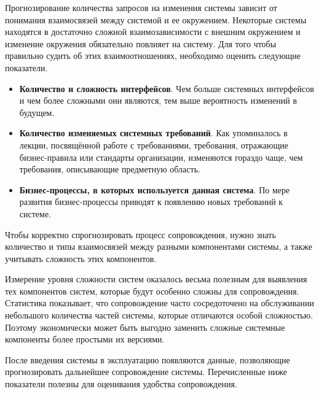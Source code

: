 \documentclass{../../text-style}
\begin{document}
Прогнозирование количества запросов на изменения системы зависит от понимания взаимосвязей между системой и ее окружением. Некоторые системы находятся в достаточно сложной взаимозависимости с внешним окружением и изменение окружения обязательно повлияет на систему. Для того чтобы правильно судить об этих взаимоотношениях, необходимо оценить следующие показатели.

\begin{itemize}
    \item \textbf{Количество и сложность интерфейсов}. Чем больше системных интерфейсов и чем более сложными они являются, тем выше вероятность изменений в будущем.
    \item \textbf{Количество изменяемых системных требований}. Как упоминалось в лекции, посвящённой работе с требованиями, требования, отражающие бизнес-правила или стандарты организации, изменяются гораздо чаще, чем требования, описывающие предметную область.
    \item \textbf{Бизнес-процессы, в которых используется данная система}. По мере развития бизнес-процессы приводят к появлению новых требований к системе.
\end{itemize}

Чтобы корректно спрогнозировать процесс сопровождения, нужно знать количество и типы взаимосвязей между разными компонентами системы, а также учитывать сложность этих компонентов.

Измерение уровня сложности систем оказалось весьма полезным для выявления тех компонентов систем, которые будут особенно сложны для сопровождения. Статистика показывает, что сопровождение часто сосредоточено на обслуживании небольшого количества частей системы, которые отличаются особой сложностью. Поэтому экономически может быть выгодно заменить сложные системные компоненты более простыми их версиями.

После введения системы в эксплуатацию появляются данные, позволяющие прогнозировать дальнейшее сопровождение системы. Перечисленные ниже показатели полезны для оценивания удобства сопровождения.
\end{document}
